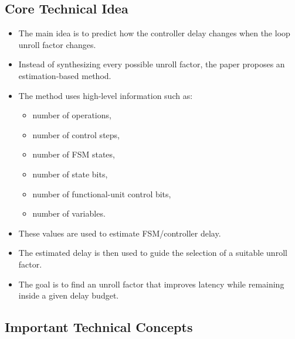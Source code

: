 \documentclass[conference]{IEEEtran}
\begin{document}
\subsection{Core Technical Idea}

\begin{itemize}
    \item The main idea is to predict how the controller delay changes when the loop unroll factor changes.
    \item Instead of synthesizing every possible unroll factor, the paper proposes an estimation-based method.
    \item The method uses high-level information such as:
    \begin{itemize}
        \item number of operations,
        \item number of control steps,
        \item number of FSM states,
        \item number of state bits,
        \item number of functional-unit control bits,
        \item number of variables.
    \end{itemize}
    \item These values are used to estimate FSM/controller delay.
    \item The estimated delay is then used to guide the selection of a suitable unroll factor.
    \item The goal is to find an unroll factor that improves latency while remaining inside a given delay budget.
\end{itemize}

\subsection{Important Technical Concepts}
\end{document}
